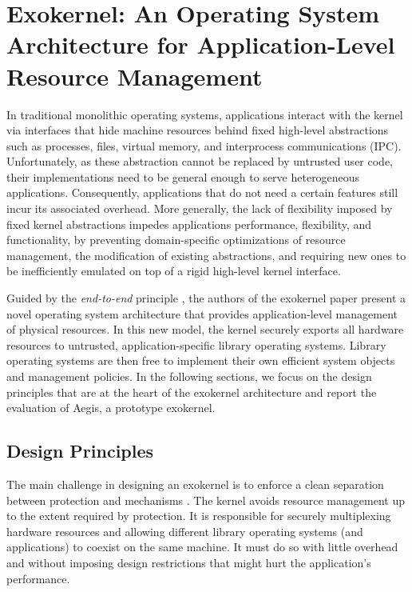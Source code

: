 \section{Exokernel: An Operating System Architecture for Application-Level Resource Management}

In traditional monolithic operating systems, applications interact with the kernel via interfaces that hide machine resources behind fixed high-level abstractions such as processes, files, virtual memory, and interprocess communications (IPC).
Unfortunately, as these abstraction cannot be replaced by untrusted user code, their implementations need to be general enough to serve heterogeneous applications.
Consequently, applications that do not need a certain features still incur its associated overhead.
More generally, the lack of flexibility imposed by fixed kernel abstractions impedes applications performance, flexibility, and functionality, by preventing domain-specific optimizations of resource management, the modification of existing abstractions, and requiring new ones to be inefficiently emulated on top of a rigid high-level kernel interface.

Guided by the \emph{end-to-end} principle \cite{DBLP:journals/tocs/SaltzerRC84}, the authors of the exokernel paper \cite{DBLP:conf/sosp/EnglerKO95} present a novel operating system architecture that provides application-level management of physical resources.
In this new model, the kernel securely exports all hardware resources to untrusted, application-specific library operating systems.
Library operating systems are then free to implement their own efficient system objects and management policies.
In the following sections, we focus on the design principles that are at the heart of the exokernel architecture and report the evaluation of Aegis, a prototype exokernel.

\subsection{Design Principles}
The main challenge in designing an exokernel is to enforce a clean separation between protection and mechanisms \cite{DBLP:journals/cacm/LampsonS76}.
The kernel avoids resource management up to the extent required by protection.
It is responsible for securely multiplexing hardware resources and allowing different library operating systems (and applications) to coexist on the same machine.
It must do so with little overhead and without imposing design restrictions that might hurt the application's performance.

